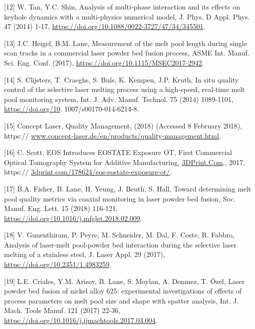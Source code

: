 \documentclass[10pt]{article}
\begin{document}
[12] W. Tan, Y.C. Shin, Analysis of multi-phase interaction and its effects on keyhole dynamics with a multi-physics numerical model, J. Phys. D Appl. Phys. 47 (2014) 1-17, \href{https://doi.org/10.1088/0022-3727/47/34/345501}{https://doi.org/10.1088/0022-3727/47/34/345501}.

[13] J.C. Heigel, B.M. Lane, Measurement of the melt pool length during single scan tracks in a commercial laser powder bed fusion process, ASME Int. Manuf. Sci. Eng. Conf. (2017), \href{https://doi.org/10.1115/MSEC2017-2942}{https://doi.org/10.1115/MSEC2017-2942}.

[14] S. Clijsters, T. Craeghs, S. Buls, K. Kempen, J.P. Kruth, In situ quality control of the selective laser melting process using a high-speed, real-time melt pool monitoring system, Int. J. Adv. Manuf. Technol. 75 (2014) 1089-1101, \href{https://doi.org/10}{https://doi.org/10}. 1007/s00170-014-6214-8.

[15] Concept Laser, Quality Management, (2018) (Accessed 8 February 2018), https:// \href{http://www.concept-laser.de/en/products/quality-management.html}{www.concept-laser.de/en/products/quality-management.html}.

[16] C. Scott, EOS Introduces EOSTATE Exposure OT, First Commercial Optical Tomography System for Additive Manufacturing, \href{http://3DPrint.Com}{3DPrint.Com}., 2017, https:// \href{http://3dprint.com/178624/eos-eostate-exposure-ot/}{3dprint.com/178624/eos-eostate-exposure-ot/}.

[17] B.A. Fisher, B. Lane, H. Yeung, J. Beuth, S. Hall, Toward determining melt pool quality metrics via coaxial monitoring in laser powder bed fusion, Soc. Manuf. Eng. Lett. 15 (2018) 116-121, \href{https://doi.org/10.1016/j.mfglet.2018.02.009}{https://doi.org/10.1016/j.mfglet.2018.02.009}.

[18] V. Gunenthiram, P. Peyre, M. Schneider, M. Dal, F. Coste, R. Fabbro, Analysis of laser-melt pool-powder bed interaction during the selective laser melting of a stainless steel, J. Laser Appl. 29 (2017), \href{https://doi.org/10.2351/1.4983259}{https://doi.org/10.2351/1.4983259}.

[19] L.E. Criales, Y.M. Arisoy, B. Lane, S. Moylan, A. Donmez, T. Özel, Laser powder bed fusion of nickel alloy 625: experimental investigations of effects of process parameters on melt pool size and shape with spatter analysis, Int. J. Mach. Tools Manuf. 121 (2017) 22-36, \href{https://doi.org/10.1016/j.ijmachtools.2017.03.004}{https://doi.org/10.1016/j.ijmachtools.2017.03.004}.
\end{document}

